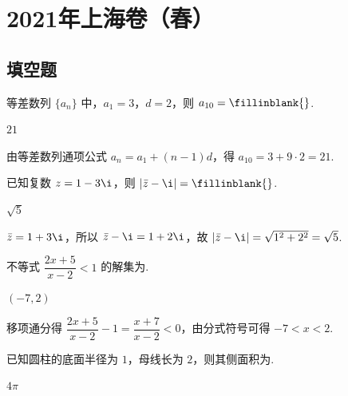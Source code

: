 \chapter{2021年上海卷（春）}

\section{填空题}

\begin{problem}
等差数列 \(\{a_n\}\) 中，\(a_1=3\)，\(d=2\)，则 \(a_{10}=\fillinblank{}\).
\end{problem}

\begin{answer}
\(21\)
\end{answer}

\begin{solution}
由等差数列通项公式 \(a_n=a_1+(n-1)d\)，得 \(a_{10}=3+9\cdot2=21\).
\end{solution}

\begin{problem}
已知复数 \(z=1-3\i\)，则 \(|\bar z-\i|=\fillinblank{}\).
\end{problem}

\begin{answer}
\(\sqrt5\)
\end{answer}

\begin{solution}
\(\bar z=1+3\i\)，所以 \(\bar z-\i=1+2\i\)，故 \(|\bar z-\i|=\sqrt{1^2+2^2}=\sqrt5\).
\end{solution}

\begin{problem}
不等式 \(\dfrac{2x+5}{x-2}<1\) 的解集为\fillinblank{}.
\end{problem}

\begin{answer}
\((-7,2)\)
\end{answer}

\begin{solution}
移项通分得 \(\dfrac{2x+5}{x-2}-1=\dfrac{x+7}{x-2}<0\)，由分式符号可得 \(-7<x<2\).
\end{solution}

\begin{problem}
已知圆柱的底面半径为 \(1\)，母线长为 \(2\)，则其侧面积为\fillinblank{}.
\end{problem}

\begin{answer}
\(4\pi\)
\end{answer}

